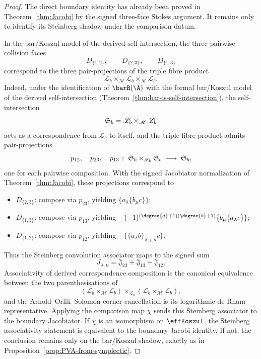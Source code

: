 \begin{proof}
The direct boundary identity has already been proved in
Theorem~\ref{thm:Jacobi} by the signed three-face Stokes argument.  It
remains only to identify its Steinberg shadow under the comparison
datum.

In the bar/Koszul model of the derived self-intersection, the three
pairwise collision faces
\[
D_{\{1,2\}},\qquad D_{\{2,3\}},\qquad D_{\{1,3\}}
\]
correspond to the three pair-projections of the triple fibre product
\[
\mathscr L_b\times_{\mathscr M}\mathscr L_b\times_{\mathscr M}\mathscr L_b .
\]
Indeed, under the identification of \(\barB(\A)\) with the formal
bar/Koszul model of the derived self-intersection
\textup{(}Theorem~\textup{\ref{thm:bar-is-self-intersection}}\textup{)},
the self-intersection
\[
\mathfrak{S}_b=\mathscr L_b\times_{\mathscr M}\mathscr L_b
\]
acts as a correspondence from \(\mathscr L_b\) to itself, and the
triple fibre product admits pair-projections
\[
p_{12},\quad p_{23},\quad p_{13}
\;\colon\;
\mathfrak{S}_b \times_{\mathscr{L}_b} \mathfrak{S}_b
\;\longrightarrow\;
\mathfrak{S}_b,
\]
one for each pairwise composition.  With the signed Jacobiator
normalization of Theorem~\ref{thm:Jacobi}, these projections correspond
to
\begin{itemize}
\item $D_{\{2,3\}}$: compose via $p_{23}$, yielding
 $\{a_\lambda \{b_\mu c\}\}$;
\item $D_{\{1,3\}}$: compose via $p_{13}$, yielding
 $-(-1)^{(\degree{a}+1)(\degree{b}+1)}
 \{b_\mu \{a_\lambda c\}\}$;
\item $D_{\{1,2\}}$: compose via $p_{12}$, yielding
 $-\{\{a_\lambda b\}_{\lambda+\mu} c\}$.
\end{itemize}
Thus the Steinberg convolution associator maps to the signed sum
\[
J_{\lambda,\mu}
=
\mathfrak J_{23}+\mathfrak J_{13}+\mathfrak J_{12}.
\]
Associativity of derived correspondence composition is the canonical
equivalence between the two parenthesisations of
\[
(\mathscr L_b\times_{\mathscr M}\mathscr L_b)
\times_{\mathscr L_b}
(\mathscr L_b\times_{\mathscr M}\mathscr L_b),
\]
and the Arnold--Orlik--Solomon corner cancellation is its logarithmic
de Rham representative.  Applying the comparison map \(\chi\) sends
this Steinberg associator to the boundary Jacobiator.  If \(\chi\) is
an isomorphism on \(\effKoszul\), the Steinberg associativity statement
is equivalent to the boundary Jacobi identity.  If not, the conclusion
remains only on the bar/Koszul shadow, exactly as in
Proposition~\ref{prop:PVA-from-symplectic}.
\end{proof}


